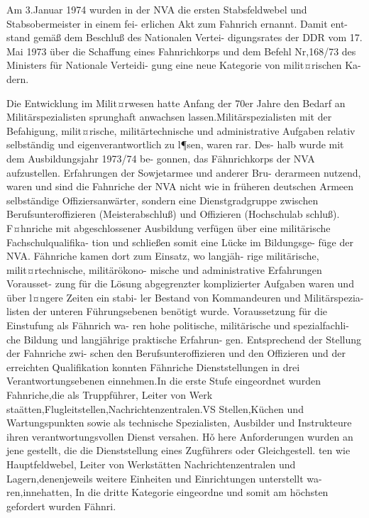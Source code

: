 

Am 3.Januar 1974 wurden in der NVA die ersten
Stabsfeldwebel und Stabsobermeister in einem fei-
erlichen Akt zum Fahnrich ernannt. Damit ent-
stand gemäß dem Beschluß des Nationalen Vertei-
digungsrates der DDR vom 17. Mai 1973 über die
Schaffung eines Fahnrichkorps und dem Befehl
Nr,168/73 des Ministers für Nationale Verteidi-
gung eine neue Kategorie von milit¤rischen Ka-
dern.

Die Entwicklung im Milit¤rwesen hatte Anfang
der 70er Jahre den Bedarf an Militärspezialisten
sprunghaft anwachsen lassen.Militärspezialisten
mit der Befahigung, milit¤rische, militärtechnische
und administrative Aufgaben relativ selbständig
und eigenverantwortlich zu l¶sen, waren rar. Des-
halb wurde mit dem Ausbildungsjahr 1973/74 be-
gonnen, das Fähnrichkorps der NVA aufzustellen.
Erfahrungen der Sowjetarmee und anderer Bru-
derarmeen nutzend, waren und sind die Fahnriche
der NVA nicht wie in früheren deutschen Armeen
selbständige
Offiziersanwärter,
sondern eine
Dienstgradgruppe zwischen Berufsunteroffizieren (Meisterabschluß) und Offizieren (Hochschulab
schluß). F¤hnriche mit abgeschlossener Ausbildung
verfügen über eine militärische Fachschulqualifika-
tion und schließen somit eine Lücke im Bildungsge-
füge der NVA.
Fähnriche kamen dort zum Einsatz, wo langjäh-
rige militärische, milit¤rtechnische, militärökono-
mische und administrative Erfahrungen Vorausset-
zung für die Lösung abgegrenzter komplizierter
Aufgaben waren und über l¤ngere Zeiten ein stabi-
ler Bestand von Kommandeuren und Militärspezia-
listen der unteren Führungsebenen benötigt wurde.
Voraussetzung für die Einstufung als Fähnrich wa-
ren hohe politische, militärische und spezialfachli-
che Bildung und langjährige praktische Erfahrun-
gen.
Entsprechend der Stellung der Fahnriche zwi-
schen den Berufsunteroffizieren und den Offizieren
und der erreichten Qualifikation konnten Fähnriche Dienststellungen in drei Verantwortungsebenen
einnehmen.In die erste Stufe eingeordnet wurden
Fahnriche,die als Truppführer, Leiter von Werk
staätten,Flugleitstellen,Nachrichtenzentralen.VS
Stellen,Küchen und Wartungspunkten sowie als
technische Spezialisten, Ausbilder und Instrukteure
ihren verantwortungsvollen Dienst versahen. Hǒ
here Anforderungen wurden an jene gestellt, die die
Dienststellung eines Zugführers oder Gleichgestell.
ten wie Hauptfeldwebel, Leiter von Werkstätten
Nachrichtenzentralen und Lagern,denenjeweils
weitere Einheiten und Einrichtungen unterstellt wa-
ren,innehatten, In die dritte Kategorie eingeordne
und somit am höchsten gefordert wurden Fähnri.
